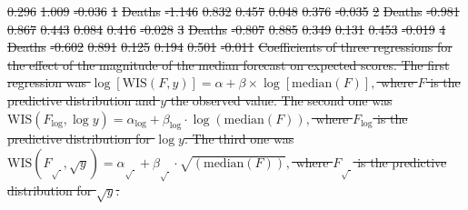 \documentclass[10pt,letterpaper]{article} %
\providecommand{\DIFdeltex}[1]{{\protect\color{red}\sout{#1}}}                      %
\providecommand{\DIFdelFL}[1]{\DIFdel{#1}} %
\providecommand{\DIFdel}[1]{\texorpdfstring{\DIFdeltex{#1}}{}} %
\begin{document}
\DIFdelFL{0.296 }%
\DIFdelFL{1.009 }%
\DIFdelFL{-0.036}%
\DIFdelFL{1 }%
\DIFdelFL{Deaths }%
\DIFdelFL{-1.146 }%
\DIFdelFL{0.832 }%
\DIFdelFL{0.457 }%
\DIFdelFL{0.048 }%
\DIFdelFL{0.376 }%
\DIFdelFL{-0.035}%
\DIFdelFL{2 }%
\DIFdelFL{Deaths }%
\DIFdelFL{-0.981 }%
\DIFdelFL{0.867 }%
\DIFdelFL{0.443 }%
\DIFdelFL{0.084 }%
\DIFdelFL{0.416 }%
\DIFdelFL{-0.028}%
\DIFdelFL{3 }%
\DIFdelFL{Deaths }%
\DIFdelFL{-0.807 }%
\DIFdelFL{0.885 }%
\DIFdelFL{0.349 }%
\DIFdelFL{0.131 }%
\DIFdelFL{0.453 }%
\DIFdelFL{-0.019}%
\DIFdelFL{4 }%
\DIFdelFL{Deaths }%
\DIFdelFL{-0.602 }%
\DIFdelFL{0.891 }%
\DIFdelFL{0.125 }%
\DIFdelFL{0.194 }%
\DIFdelFL{0.501 }%
\DIFdelFL{-0.011}%
{%
\DIFdelFL{Coefficients of three regressions for the effect of the magnitude of the median forecast on expected scores. The first regression was 
$\log[\text{WIS}(F, y)] = \alpha + \beta \times \log[\text{median}(F)], $ where $F$ is the predictive distribution and $y$ the observed value. The second one was 
$\text{WIS}(F_{\log}, \log y) = \alpha_{\log} + \beta_{\log} \cdot \log{(\text{median}(F))},$ where $F_{\log}$ is the predictive distribution for $\log y$. The third one was $\text{WIS}(F_{\sqrt{\ }}, \sqrt{y}) = \alpha_{\sqrt{\ }} + \beta_{\sqrt{\ }} \cdot \sqrt{(\text{median}(F))},$ where $F_{\sqrt{\ }}$ is the predictive distribution for $\sqrt{y}$.
}}
\end{document}
